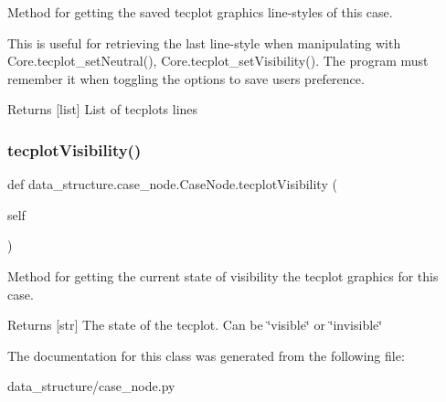Method for getting the saved tecplot graphics line-\/styles of this case. 

This is useful for retrieving the last line-\/style when manipulating with Core.\+tecplot\+\_\+set\+Neutral(), Core.\+tecplot\+\_\+set\+Visibility(). The program must remember it when toggling the options to save user\textquotesingle{}s preference.

\begin{DoxyReturn}{Returns}
\mbox{[}list\mbox{]} List of tecplots lines 
\end{DoxyReturn}
\hypertarget{a00089_aeb90281663e7094357befb23383a0d12}{}\label{a00089_aeb90281663e7094357befb23383a0d12} 
\subsubsection{\texorpdfstring{tecplot\+Visibility()}{tecplotVisibility()}}
{\footnotesize\ttfamily def data\+\_\+structure.\+case\+\_\+node.\+Case\+Node.\+tecplot\+Visibility (\begin{DoxyParamCaption}\item[{}]{self }\end{DoxyParamCaption})}



Method for getting the current state of visibility the tecplot graphics for this case. 

\begin{DoxyReturn}{Returns}
\mbox{[}str\mbox{]} The state of the tecplot. Can be \char`\"{}visible\char`\"{} or \char`\"{}invisible\char`\"{} 
\end{DoxyReturn}


The documentation for this class was generated from the following file\+:\begin{DoxyCompactItemize}
\item 
data\+\_\+structure/case\+\_\+node.\+py\end{DoxyCompactItemize}
